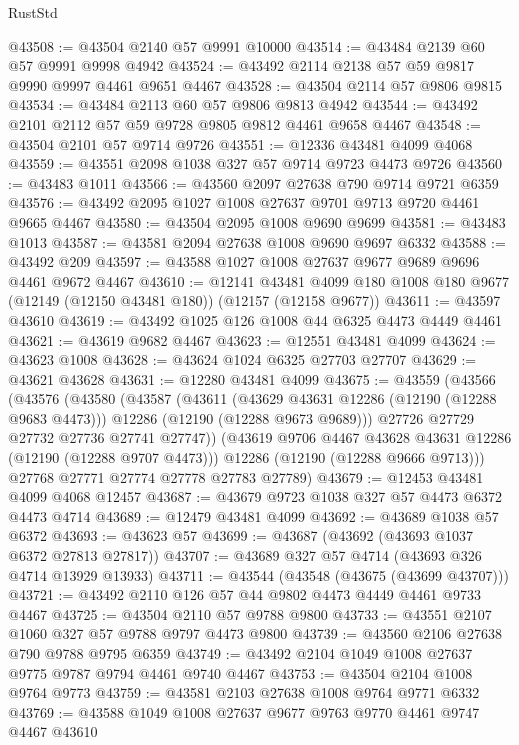 \begin{lexlean}{RustStd}
\begin{coremodule}
@43508 := @43504 @2140 @57 @9991 @10000
@43514 := @43484 @2139 @60 @57 @9991 @9998 @4942
@43524 := @43492 @2114 @2138 @57 @59 @9817 @9990 @9997 @4461 @9651 @4467
@43528 := @43504 @2114 @57 @9806 @9815
@43534 := @43484 @2113 @60 @57 @9806 @9813 @4942
@43544 := @43492 @2101 @2112 @57 @59 @9728 @9805 @9812 @4461 @9658 @4467
@43548 := @43504 @2101 @57 @9714 @9726
@43551 := @12336 @43481 @4099 @4068
@43559 := @43551 @2098 @1038 @327 @57 @9714 @9723 @4473 @9726
@43560 := @43483 @1011
@43566 := @43560 @2097 @27638 @790 @9714 @9721 @6359
@43576 := @43492 @2095 @1027 @1008 @27637 @9701 @9713 @9720 @4461 @9665 @4467
@43580 := @43504 @2095 @1008 @9690 @9699
@43581 := @43483 @1013
@43587 := @43581 @2094 @27638 @1008 @9690 @9697 @6332
@43588 := @43492 @209
@43597 := @43588 @1027 @1008 @27637 @9677 @9689 @9696 @4461 @9672 @4467
@43610 := @12141
    @43481
    @4099
    @180
    @1008
    @180
    @9677
    (@12149 (@12150 @43481 @180))
    (@12157 (@12158 @9677))
@43611 := @43597 @43610
@43619 := @43492 @1025 @126 @1008 @44 @6325 @4473 @4449 @4461
@43621 := @43619 @9682 @4467
@43623 := @12551 @43481 @4099
@43624 := @43623 @1008
@43628 := @43624 @1024 @6325 @27703 @27707
@43629 := @43621 @43628
@43631 := @12280 @43481 @4099
@43675 := @43559
    (@43566
      (@43576
        (@43580
          (@43587
            (@43611
              (@43629 @43631 @12286 (@12190 (@12288 @9683 @4473)))
              @12286
              (@12190 (@12288 @9673 @9689)))
            @27726
            @27729
            @27732
            @27736
            @27741
            @27747))
        (@43619 @9706 @4467 @43628 @43631 @12286 (@12190 (@12288 @9707 @4473)))
        @12286
        (@12190 (@12288 @9666 @9713)))
      @27768
      @27771
      @27774
      @27778
      @27783
      @27789)
@43679 := @12453 @43481 @4099 @4068 @12457
@43687 := @43679 @9723 @1038 @327 @57 @4473 @6372 @4473 @4714
@43689 := @12479 @43481 @4099
@43692 := @43689 @1038 @57 @6372
@43693 := @43623 @57
@43699 := @43687 (@43692 (@43693 @1037 @6372 @27813 @27817))
@43707 := @43689 @327 @57 @4714 (@43693 @326 @4714 @13929 @13933)
@43711 := @43544 (@43548 (@43675 (@43699 @43707)))
@43721 := @43492 @2110 @126 @57 @44 @9802 @4473 @4449 @4461 @9733 @4467
@43725 := @43504 @2110 @57 @9788 @9800
@43733 := @43551 @2107 @1060 @327 @57 @9788 @9797 @4473 @9800
@43739 := @43560 @2106 @27638 @790 @9788 @9795 @6359
@43749 := @43492 @2104 @1049 @1008 @27637 @9775 @9787 @9794 @4461 @9740 @4467
@43753 := @43504 @2104 @1008 @9764 @9773
@43759 := @43581 @2103 @27638 @1008 @9764 @9771 @6332
@43769 := @43588 @1049 @1008 @27637 @9677 @9763 @9770 @4461 @9747 @4467 @43610

\end{coremodule}
\end{lexlean}
